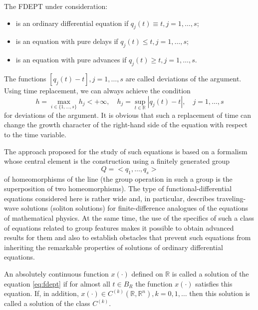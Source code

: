 \documentclass[
11pt,%
tightenlines,%
twoside,%
onecolumn,%
nofloats,%
nobibnotes,%
nofootinbib,%
superscriptaddress,%
noshowpacs,%
centertags,aps]%
{revtex4}
\begin{document}
The FDEPT under consideration:
\begin{itemize}
\item is an ordinary differential equation if $q_j(t)\equiv t, j=1,\ldots,s$;
\item is an equation with pure delays if $q_j(t)\le t, j=1,\ldots,s$;
\item is an equation with pure advances if $q_j(t)\ge t, j=1,\ldots,s$.
\end{itemize}
The functions $[q_j(t)-t], j=1,\ldots,s$ are called deviations of the argument. Using time replacement, we can always achieve the condition
\begin{equation*}
h=\max_{i\in \{1,\ldots,s\}} h_j<+\infty,\quad h_j=\sup_{t\in \mathbb R}|q_j(t)-t|,\quad j=1,\ldots,s
\end{equation*}
for deviations of the argument. It is obvious that such a replacement of time can change the growth character of the right-hand side of the equation with respect to the time variable.

The approach proposed for the study of such equations is based on a formalism whose central element is the construction using a finitely generated group
\[
Q=<q_1,\ldots,q_s>
\]
of homeomorphisms of the line (the group operation in such a group is the superposition of two homeomorphisms). The type of functional-differential equations considered here is rather wide and, in particular, describes traveling-wave solutions (soliton solutions) for finite-difference analogues of the equations of mathematical physics. At the same time, the use of the specifics of such a class of equations related to group features makes it possible to obtain advanced results for them and also to establish obstacles that prevent such equations from inheriting the remarkable properties of solutions of ordinary differential equations.

\begin{definition}
An absolutely continuous function $x(\cdot)$ defined on $\mathbb R$ is called a solution of the equation \eqref{eq:fdept} if for almost all $t\in B_R$ the function $x(\cdot)$ satisfies this equation. If, in addition, $x(\cdot)\in C^{(k)}(\mathbb R,\mathbb R^n), k=0,1,\ldots$ then this solution is called a solution of the class $C^{(k)}$.
\end{definition}
\end{document}
